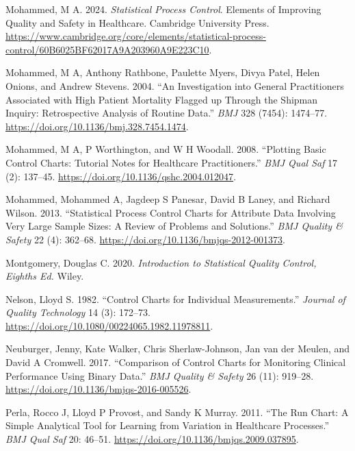 \documentclass[
]{book}
\newlength{\cslhangindent}
\newenvironment{CSLReferences}[2] %
 {\begin{list}{}{%
  \setlength{\itemindent}{0pt}
  \setlength{\leftmargin}{0pt}
  \setlength{\parsep}{0pt}
  \ifodd #1
   \setlength{\leftmargin}{\cslhangindent}
   \setlength{\itemindent}{-1\cslhangindent}
  \fi
  \setlength{\itemsep}{#2\baselineskip}}}
 {\end{list}}
\begin{document}
\begin{CSLReferences}{1}{1}
Mohammed, M A. 2024. \emph{Statistical Process Control}. Elements of
Improving Quality and Safety in Healthcare. Cambridge University Press.
\url{https://www.cambridge.org/core/elements/statistical-process-control/60B6025BF62017A9A203960A9E223C10}.

Mohammed, M A, Anthony Rathbone, Paulette Myers, Divya Patel, Helen
Onions, and Andrew Stevens. 2004. {``An Investigation into General
Practitioners Associated with High Patient Mortality Flagged up Through
the Shipman Inquiry: Retrospective Analysis of Routine Data.''}
\emph{BMJ} 328 (7454): 1474--77.
\url{https://doi.org/10.1136/bmj.328.7454.1474}.

Mohammed, M A, P Worthington, and W H Woodall. 2008. {``Plotting Basic
Control Charts: Tutorial Notes for Healthcare Practitioners.''}
\emph{BMJ Qual Saf} 17 (2): 137--45.
\url{https://doi.org/10.1136/qshc.2004.012047}.

Mohammed, Mohammed A, Jagdeep S Panesar, David B Laney, and Richard
Wilson. 2013. {``Statistical Process Control Charts for Attribute Data
Involving Very Large Sample Sizes: A Review of Problems and
Solutions.''} \emph{BMJ Quality \& Safety} 22 (4): 362--68.
\url{https://doi.org/10.1136/bmjqs-2012-001373}.

Montgomery, Douglas C. 2020. \emph{Introduction to Statistical Quality
Control, Eighths Ed.} Wiley.

Nelson, Lloyd S. 1982. {``Control Charts for Individual Measurements.''}
\emph{Journal of Quality Technology} 14 (3): 172--73.
\url{https://doi.org/10.1080/00224065.1982.11978811}.

Neuburger, Jenny, Kate Walker, Chris Sherlaw-Johnson, Jan van der
Meulen, and David A Cromwell. 2017. {``Comparison of Control Charts for
Monitoring Clinical Performance Using Binary Data.''} \emph{BMJ Quality
\& Safety} 26 (11): 919--28.
\url{https://doi.org/10.1136/bmjqs-2016-005526}.

Perla, Rocco J, Lloyd P Provost, and Sandy K Murray. 2011. {``The Run
Chart: A Simple Analytical Tool for Learning from Variation in
Healthcare Processes.''} \emph{BMJ Qual Saf} 20: 46--51.
\url{https://doi.org/10.1136/bmjqs.2009.037895}.


\end{CSLReferences}
\end{document}
